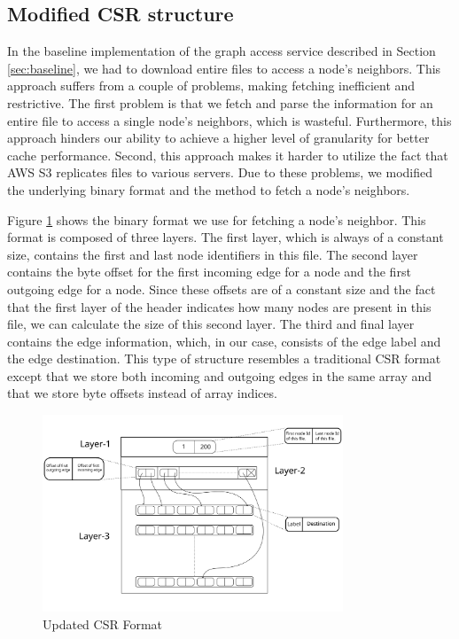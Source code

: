 \subsection{Modified CSR structure}\label{sec:modifiedCsr}
In the baseline implementation of the graph access service described in
Section \ref{sec:baseline}, we had to download entire files to access
a node's neighbors. This approach suffers from a couple of problems, making
fetching inefficient and restrictive. The first problem is that we
fetch and parse the information for an entire file to access a single
node's neighbors, which is wasteful. Furthermore, this approach hinders our
ability to achieve a higher level of granularity for better cache performance.
Second, this approach makes it harder to utilize the fact that AWS S3 replicates
files to various servers. Due to these problems, we modified the
underlying binary format and the method to fetch a node's neighbors.

\medskip
Figure \ref{fig:csrFormat} shows the binary format we use for fetching a
node's neighbor. This format is composed of three layers. The
first layer, which is always of a constant size, contains the first and last
node identifiers in this file. The second layer contains the byte offset
for the first incoming edge for a node and the first outgoing edge for a node.
Since these offsets are of a constant size and the fact that the first layer of
the header indicates how many nodes are present in this file, we can calculate
the size of this second layer. The third and final layer contains the edge
information, which, in our case, consists of the edge label and the edge
destination. This type of structure resembles a traditional CSR format
except that we store both incoming and outgoing edges in the same
array and that we store byte offsets instead of array indices.
\begin{figure}[ht]
    \centering
    \includegraphics[width=0.8\textwidth]{figures/csrFormat.png}
    \caption{Updated CSR Format}
    \label{fig:csrFormat}
\end{figure}

